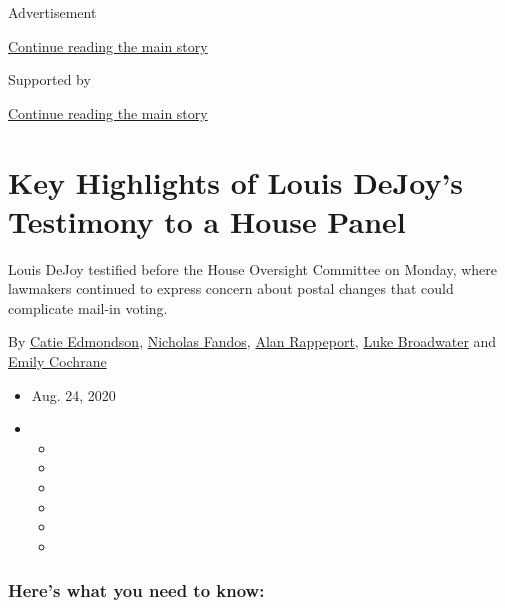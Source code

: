 Advertisement

\protect\hyperlink{after-top}{Continue reading the main story}

Supported by

\protect\hyperlink{after-sponsor}{Continue reading the main story}

\hypertarget{key-highlights-of-louis-dejoys-testimony-to-a-house-panel}{%
\section{Key Highlights of Louis DeJoy's Testimony to a House
Panel}\label{key-highlights-of-louis-dejoys-testimony-to-a-house-panel}}

Louis DeJoy testified before the House Oversight Committee on Monday,
where lawmakers continued to express concern about postal changes that
could complicate mail-in voting.

By \href{https://www.nytimes3xbfgragh.onion/by/catie-edmondson}{Catie
Edmondson},
\href{https://www.nytimes3xbfgragh.onion/by/nicholas-fandos}{Nicholas
Fandos},
\href{https://www.nytimes3xbfgragh.onion/by/alan-rappeport}{Alan
Rappeport},
\href{https://www.nytimes3xbfgragh.onion/by/luke-broadwater}{Luke
Broadwater} and
\href{https://www.nytimes3xbfgragh.onion/by/emily-cochrane}{Emily
Cochrane}

\begin{itemize}
\item
  Aug. 24, 2020
\item
  \begin{itemize}
  \item
  \item
  \item
  \item
  \item
  \item
  \end{itemize}
\end{itemize}

\hypertarget{heres-what-you-need-to-know}{%
\subsubsection{Here's what you need to
know:}\label{heres-what-you-need-to-know}}

